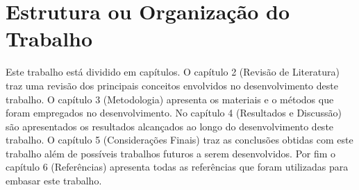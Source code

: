 \section{Estrutura ou Organização do Trabalho}
Este trabalho está dividido em capítulos. O capítulo 2 (Revisão de Literatura) traz uma revisão dos principais conceitos envolvidos no desenvolvimento deste trabalho. O capítulo 3 (Metodologia) apresenta os materiais e o métodos que foram empregados no desenvolvimento. No capítulo 4 (Resultados e Discussão) são apresentados os resultados alcançados ao longo do desenvolvimento deste trabalho. O capítulo 5 (Considerações Finais) traz as conclusões obtidas com este trabalho além de possíveis trabalhos futuros a serem desenvolvidos. Por fim o capítulo 6 (Referências) apresenta todas as referências que foram utilizadas para embasar este trabalho.